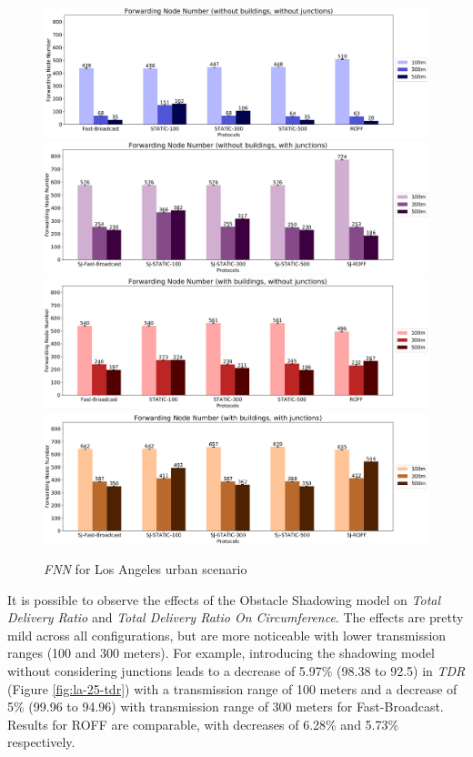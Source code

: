 		\begin{figure}[H]
			\centering
			\includegraphics[width=1.0\textwidth]{immagini/la-25/b0/j0/fnn}
			\includegraphics[width=1.0\textwidth]{immagini/la-25/b0/j1/fnn}
			\includegraphics[width=1.0\textwidth]{immagini/la-25/b1/j0/fnn}
			\includegraphics[width=1.0\textwidth]{immagini/la-25/b1/j1/fnn}
			\caption{\textit{FNN} for Los Angeles urban scenario}
			\label{fig:la-25-fnn}
		\end{figure}
	
		It is possible to observe the effects of the Obstacle Shadowing model on \textit{Total Delivery Ratio} and \textit{Total Delivery Ratio On Circumference}. The effects are pretty mild across all configurations, but are more noticeable with lower transmission ranges (100 and 300 meters). For example, introducing the shadowing model without considering junctions leads to a decrease of 5.97\% (98.38 to 92.5) in \textit{TDR} (Figure \ref{fig:la-25-tdr}) with a transmission range of 100 meters and a decrease of 5\% (99.96 to 94.96) with transmission range of 300 meters for Fast-Broadcast. Results for ROFF are comparable, with decreases of 6.28\% and 5.73\% respectively.
		
